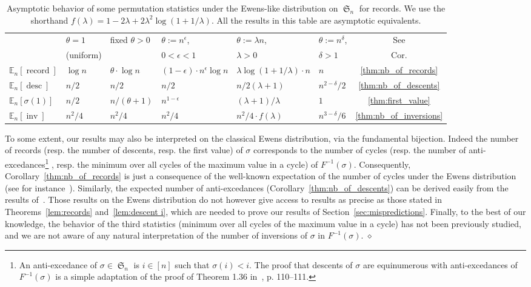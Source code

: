 \documentclass[proceedings]{aofa}
\newcommand{\EE}{\mathbb{E}}
\DeclareMathOperator{\sym}{\mathfrak{S}}
\DeclareMathOperator{\rec}{record}
\DeclareMathOperator{\desc}{desc}
\DeclareMathOperator{\inv}{inv}
\newenvironment{remark}{\noindent{\bf Remark:} }{\hfill$\diamond$}
\begin{document}
\begin{table}[ht]\label{table:asymptotics}
\begin{center}
\begin{tabular}{l|l|l|l|l|l|c}
& $\theta=1$ & fixed $\theta>0$ & $\theta := n^{\epsilon}$,  & $\theta :=  \lambda n$, & $\theta := n^{\delta}$, &See \\
& {\small (uniform)}& & {\small $0<\epsilon<1$ }& {\small $\lambda>0$} & {\small $\delta>1$ }&Cor.\\
\hline 
$\EE_{n}[\rec]$ & $ \log n $ & $ \theta\cdot \log n $ & $ (1-\epsilon)\cdot n^{\epsilon}\log n$ & $ \lambda \log(1 + 1/\lambda)\cdot n$ & $ n$ & \ref{thm:nb_of_records}\\
$\EE_{n}[\desc]$ & $  n/2 $ & $  n/2 $ & $  n/2$ & $ n/2(\lambda + 1)$ & $ n^{2-\delta}/2$ & \ref{thm:nb_of_descents}\\
$\EE_{n}[\sigma(1)]$ & $ n/2$ & $  n/(\theta  + 1) $ & $  n^{1-\epsilon}$ & $ (\lambda + 1)/\lambda$ & $ 1$ & \ref{thm:first_value}\\
$\EE_{n}[\inv]$ & $ n^2/4$ & $ n^2/4$ & $ {n^{2}}/4$ & $ {n^{2}}/4 \cdot f(\lambda)$ & $ {n^{3-\delta}}/{6}$ & \ref{thm:nb_of_inversions}\\
\end{tabular}
\end{center}
\caption{Asymptotic behavior of some permutation statistics under the Ewens-like distribution on $\sym_n$ for records.  
We use the shorthand $f(\lambda) = 1-2\lambda + 2\lambda^{2}\log\left(1 + 1/\lambda\right)$.
All the results in this table are asymptotic equivalents.
}
\end{table}

\begin{remark}
To some extent, our results may also be interpreted on the classical Ewens distribution, via the fundamental bijection. 
Indeed the number of records (resp. the number of descents, resp. the first value) of $\sigma$ 
corresponds to the number of cycles (resp. the number of anti-excedances\footnote{An anti-excedance of $\sigma \in \sym_n$ is $i \in [n]$ such that $\sigma(i) <i$. 
The proof that descents of $\sigma$ are equinumerous with anti-excedances of $F^{-1}(\sigma)$ is a simple adaptation of the proof of Theorem 1.36 in~\cite{Bona}, p. 110--111.}
, resp. the minimum over all cycles of the maximum value in a cycle) 
of $F^{-1}(\sigma)$. 
Consequently, Corollary~\ref{thm:nb_of_records} is just a consequence of the well-known expectation 
of the number of cycles under the Ewens distribution (see for instance~\cite[\S 5.2]{Arratia}).  
Similarly, the expected number of anti-excedances (Corollary~\ref{thm:nb_of_descents}) can be derived easily from the results of~\cite{Valentin}. 
Those results on the Ewens distribution do not however give access to results as precise as those stated in Theorems~\ref{lem:records} and~\ref{lem:descent i}, 
which are needed to prove our results of Section~\ref{sec:mispredictions}. 
Finally, to the best of our knowledge, the behavior of the third statistics (minimum over all cycles of the maximum value in a cycle) has not been previously studied, 
and we are not aware of any natural interpretation of the number of inversions of $\sigma$ in $F^{-1}(\sigma)$. 
\end{remark}
\end{document}
